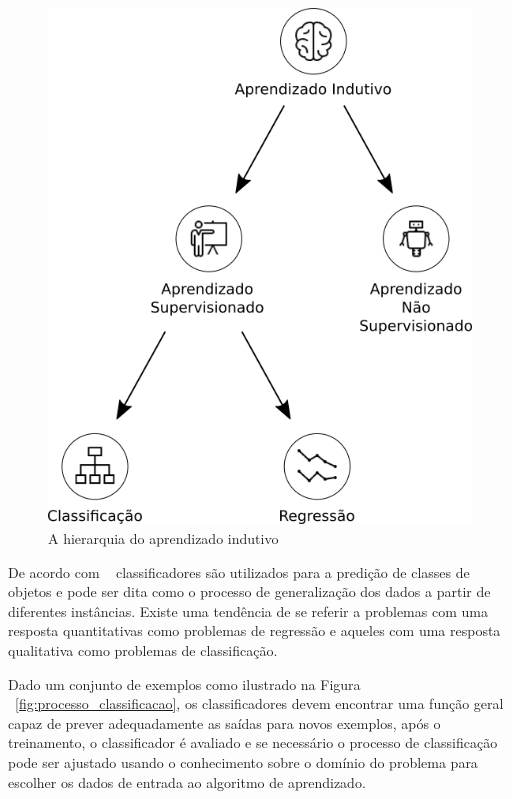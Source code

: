 \begin{figure}[H]
\begin{center}
    \includegraphics[scale=0.75]{figuras/aprendizado_indutivo.png}
\end{center}
\caption{A hierarquia do aprendizado indutivo}
\label{fig:aprendizado_indutivo}
\end{figure}

De acordo com ~\cite{porthos_motta:2016} classificadores são utilizados para a predição de classes de objetos e pode ser dita como o processo de generalização dos dados a partir de diferentes instâncias. Existe uma tendência de se referir a problemas com uma resposta quantitativas como problemas de regressão e aqueles com uma resposta qualitativa como problemas de classificação.

Dado um conjunto de exemplos como ilustrado na Figura ~\ref{fig:processo_classificacao}, os classificadores devem encontrar uma função geral capaz de prever adequadamente as saídas para novos exemplos, após o treinamento, o classificador é avaliado e se necessário o processo de classificação pode ser ajustado usando o conhecimento sobre o domínio do problema para escolher os dados de entrada ao algoritmo de aprendizado. 

